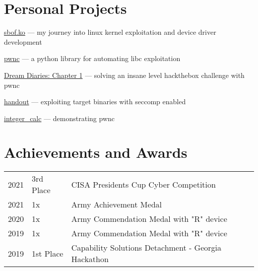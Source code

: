 \documentclass[]{resume}
\begin{document}
\begin{minipage}[t]{0.69\textwidth}
\section{Personal Projects}
\begin{tightemize}
\item \href{https://joe-hilbert.gitbook.io/public-portfolio/content/sbof.ko}{sbof.ko} --- my journey into linux kernel exploitation and device driver development
\item \href{https://github.com/jhilbs3/pwnc}{pwnc} --- a python library for automating libc exploitation
\item \href{https://joe-hilbert.gitbook.io/public-portfolio/content/dream-diaries-chapter-1}{Dream Diaries: Chapter 1} --- solving an insane level hackthebox challenge with pwnc
\item \href{https://joe-hilbert.gitbook.io/public-portfolio/content/handout}{handout} --- exploiting target binaries with seccomp enabled
\item \href{https://joe-hilbert.gitbook.io/public-portfolio/content/integer_calc}{integer\_calc} --- demonstrating pwnc

\end{tightemize}

\section{Achievements and Awards}
\begin{tabular}{rll}
2021         & 3rd Place  & CISA Presidents Cup Cyber Competition \\
2021         & 1x         & Army Achievement Medal \\
2020		 & 1x         & Army Commendation Medal with "R" device \\
2019         & 1x         & Army Commendation Medal with "R" device \\
2019         & 1st Place  & Capability Solutions Detachment - Georgia Hackathon
\end{tabular}


\end{minipage}

%
%

\end{document}
